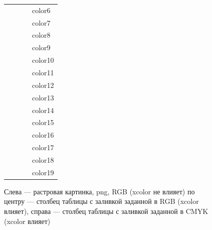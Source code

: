 \begin{figure}[!h]
\begin{minipage}{0.5\textwidth}
\begin{tabular}{p{1.5cm} p{1cm} p{1.5cm} p{1cm}}
          \cellcolor[rgb]{0.00000,1.00000,1.00000}{~} & ~ & \cellcolor[cmyk]{0.84741,0.00000,0.02052,0.00026}{~} & {color6} \\
          \cellcolor[rgb]{0.00000,0.75294,0.00000}{~} & ~ & \cellcolor[cmyk]{0.78500,0.00000,0.99997,0.00032}{~} & {color7} \\
          \cellcolor[rgb]{0.00000,0.25098,0.00000}{~} & ~ & \cellcolor[cmyk]{0.74954,0.41801,0.83082,0.63682}{~} & {color8} \\
          \cellcolor[rgb]{0.50196,0.00000,0.00000}{~} & ~ & \cellcolor[cmyk]{0.26699,0.98015,0.81404,0.43252}{~} & {color9} \\
          \cellcolor[rgb]{0.75294,0.25098,0.00000}{~} & ~ & \cellcolor[cmyk]{0.08933,0.89926,0.96097,0.06418}{~} & {color10} \\
          \cellcolor[rgb]{0.00000,1.00000,0.00000}{~} & ~ & \cellcolor[cmyk]{0.64434,0.00000,0.99997,0.00000}{~} & {color11} \\
          \cellcolor[rgb]{1.00000,0.00000,0.00000}{~} & ~ & \cellcolor[cmyk]{0.00012,0.99997,0.99840,0.01167}{~} & {color12} \\
          \cellcolor[rgb]{1.00000,0.00000,0.60000}{~} & ~ & \cellcolor[cmyk]{0.00627,0.99583,0.05092,0.00235}{~} & {color13} \\
          \cellcolor[rgb]{1.00000,0.50196,0.00000}{~} & ~ & \cellcolor[cmyk]{0.00317,0.75140,0.98398,0.00516}{~} & {color14} \\
          \cellcolor[rgb]{0.50196,0.50196,1.00000}{~} & ~ & \cellcolor[cmyk]{0.80249,0.35647,0.00000,0.00034}{~} & {color15} \\
          \cellcolor[rgb]{0.47451,0.20000,0.82353}{~} & ~ & \cellcolor[cmyk]{0.77577,0.84265,0.00000,0.00157}{~} & {color16} \\
          \cellcolor[rgb]{1.00000,1.00000,0.00000}{~} & ~ & \cellcolor[cmyk]{0.05483,0.00124,0.97897,0.00024}{~} & {color17} \\
          \cellcolor[rgb]{1.00000,0.50196,0.50196}{~} & ~ & \cellcolor[cmyk]{0.00673,0.76382,0.56541,0.00029}{~} & {color18} \\
          \cellcolor[rgb]{0.20000,0.40000,0.00000}{~} & ~ & \cellcolor[cmyk]{0.74580,0.29775,0.94908,0.26606}{~} & {color19} \\
		\end{tabular}%
	\end{minipage}%
	\caption{Слева --- растровая картинка, png, RGB (xcolor не влияет) \newline
			 по центру --- столбец таблицы с заливкой заданной в RGB (xcolor влияет), 
			 справа --- столбец таблицы с заливкой заданной в CMYK (xcolor влияет)}
\end{figure}%